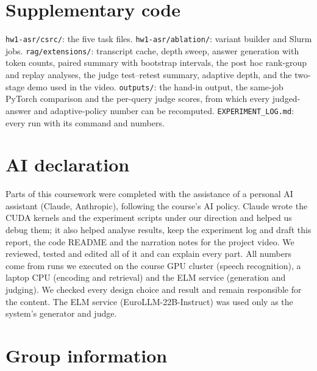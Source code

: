 \documentclass{article}
\begin{document}
\section{Supplementary code}
\label{app:code}
\texttt{hw1-asr/csrc/}: the five task files. \texttt{hw1-asr/ablation/}: variant builder and Slurm jobs. \texttt{rag/extensions/}: transcript cache, depth sweep, answer generation with token counts, paired summary with bootstrap intervals, the post hoc rank-group and replay analyses, the judge test--retest summary, adaptive depth, and the two-stage demo used in the video. \texttt{outputs/}: the hand-in output, the same-job PyTorch comparison and the per-query judge scores, from which every judged-answer and adaptive-policy number can be recomputed. \texttt{EXPERIMENT\_LOG.md}: every run with its command and numbers.

\clearpage
\newpage

\section*{AI declaration}
Parts of this coursework were completed with the assistance of a personal AI assistant (Claude, Anthropic), following the course's AI policy. Claude wrote the CUDA kernels and the experiment scripts under our direction and helped us debug them; it also helped analyse results, keep the experiment log and draft this report, the code README and the narration notes for the project video. We reviewed, tested and edited all of it and can explain every part. All numbers come from runs we executed on the course GPU cluster (speech recognition), a laptop CPU (encoding and retrieval) and the ELM service (generation and judging). We checked every design choice and result and remain responsible for the content. The ELM service (EuroLLM-22B-Instruct) was used only as the system's generator and judge.

\section*{Group information}
\end{document}
